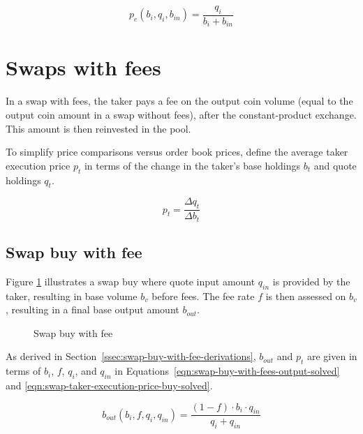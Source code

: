 \documentclass[table, twocolumn]{article}
\begin{document}
\begin{equation}\label{eqn:swap-sell-execution-price-solved}
	p_e (b_i, q_i, b_{in}) = \frac{q_i}{b_i + b_{in}}
\end{equation}

\section{Swaps with fees}\label{sec:swaps-with-fees}

In a swap with fees, the taker pays a fee on the output coin volume (equal to the output
coin amount in a swap without fees), after the constant-product exchange. This amount is
then reinvested in the pool.

To simplify price comparisons versus order book prices, define the average taker
execution price $p_t$ in terms of the change in the taker's base holdings $b_t$ and
quote holdings $q_t$.

\begin{equation}\label{eqn:swap-taker-execution-price}
  p_t = \frac{\Delta q_t}{\Delta b_t}
\end{equation}

\subsection{Swap buy with fee}\label{ssec:swap-buy-with-fee}

Figure \ref{fig:swap-buy-with-fee} illustrates a swap buy where quote input amount
$q_{in}$ is provided by the taker, resulting in base volume $b_v$ before fees. The fee
rate $f$ is then assessed on $b_v$, resulting in a final base output amount $b_{out}$.

\begin{figure}[!htb]
	\centering
	
	\caption{Swap buy with fee}\label{fig:swap-buy-with-fee}
\end{figure}

As derived in Section~\ref{ssec:swap-buy-with-fee-derivations}, $b_{out}$ and $p_t$ are
given in terms of $b_i$, $f$, $q_i$, and $q_{in}$ in
Equations~\ref{eqn:swap-buy-with-fees-output-solved} and
\ref{eqn:swap-taker-execution-price-buy-solved}.

\begin{equation}\label{eqn:swap-buy-with-fees-output-solved}
  b_{out} (b_i, f, q_i, q_{in}) =
  \frac{(1 - f) \cdot b_i \cdot q_{in}}{q_i + q_{in}}
\end{equation}
\end{document}
